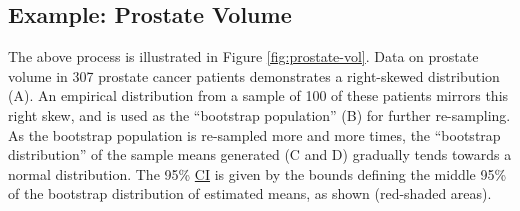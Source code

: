 \documentclass[
]{article}
\begin{document}
\subsection{Example: Prostate Volume}\label{example-prostate-volume}

The above process is illustrated in Figure \ref{fig:prostate-vol}. Data on prostate volume in 307 prostate cancer patients demonstrates a right-skewed distribution (A). An empirical distribution from a sample of 100 of these patients mirrors this right skew, and is used as the ``bootstrap population'' (B) for further re-sampling. As the bootstrap population is re-sampled more and more times, the ``bootstrap distribution'' of the sample means generated (C and D) gradually tends towards a normal distribution. The 95\% \hyperref[acronyms_CI]{CI} is given by the bounds defining the middle 95\% of the bootstrap distribution of estimated means, as shown (red-shaded areas).
\end{document}
